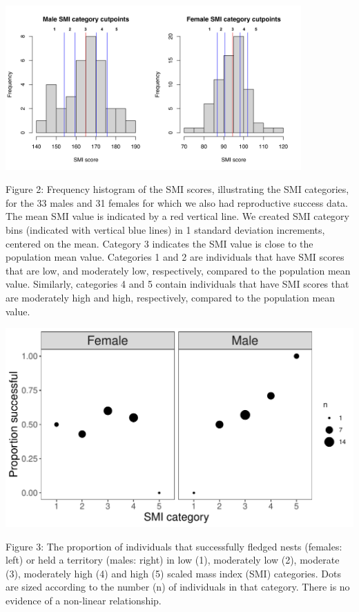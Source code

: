 \documentclass[
]{article}
\begin{document}
\includegraphics[width=0.85\textwidth,height=\textheight]{gconditionfig2.jpg}

Figure 2: Frequency histogram of the SMI scores, illustrating the SMI
categories, for the 33 males and 31 females for which we also had
reproductive success data. The mean SMI value is indicated by a red
vertical line. We created SMI category bins (indicated with vertical
blue lines) in 1 standard deviation increments, centered on the mean.
Category 3 indicates the SMI value is close to the population mean
value. Categories 1 and 2 are individuals that have SMI scores that are
low, and moderately low, respectively, compared to the population mean
value. Similarly, categories 4 and 5 contain individuals that have SMI
scores that are moderately high and high, respectively, compared to the
population mean value.

\includegraphics{gcondition_files/figure-latex/p2 non-linear trend results-1.pdf}

Figure 3: The proportion of individuals that successfully fledged nests
(females: left) or held a territory (males: right) in low (1),
moderately low (2), moderate (3), moderately high (4) and high (5)
scaled mass index (SMI) categories. Dots are sized according to the
number (n) of individuals in that category. There is no evidence of a
non-linear relationship.
\end{document}
